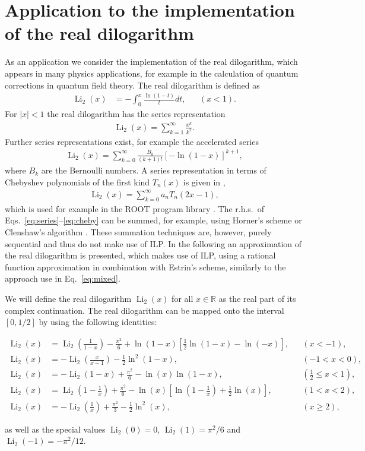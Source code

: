 \documentclass[10pt,DIV16,twocolumn]{scrartcl}
\newcommand{\Li}{\operatorname{Li}_2}
\begin{document}
\section{Application to the implementation of the real dilogarithm}

As an application we consider the implementation of the real
dilogarithm, which appears in many physics applications, for example
in the calculation of quantum corrections in quantum field theory.
The real dilogarithm is defined as
%
\begin{align}
  \Li(x) &= -\int_0^x \frac{\ln(1-t)}{t}dt, &
  &(x<1).
\end{align}
%
For $|x|<1$ the real dilogarithm has the series representation
%
\begin{align}
  \Li(x) = \sum_{k=1}^\infty \frac{x^k}{k^2}.
  \label{eq:series}
\end{align}
%
Further series representations exist, for example the accelerated
series
%
\begin{align}
  \Li(x) = \sum_{k=0}^\infty \frac{B_k}{(k+1)!} [-\ln(1-x)]^{k+1},
\end{align}
%
where $B_k$ are the Bernoulli numbers.  A series representation in
terms of Chebyshev polynomials of the first kind $T_n(x)$ is given in
\cite{luke},
%
\begin{align}
  \Li(x) = \sum_{k=0}^\infty a_n T_n(2x-1),
  \label{eq:cheby}
\end{align}
%
which is used for example in the ROOT program library \cite{root}.
The r.h.s.\ of Eqs.~\eqref{eq:series}--\eqref{eq:cheby} can be summed,
for example, using Horner's scheme or Clenshaw's algorithm
\cite{clenshaw}.  These summation techniques are, however, purely
sequential and thus do not make use of ILP.  In the following an
approximation of the real dilogarithm is presented, which makes use of
ILP, using a rational function approximation in combination with
Estrin's scheme, similarly to the approach use in
Eq.~\eqref{eq:mixed}.

We will define the real dilogarithm $\Li(x)$ for all $x\in\mathbb{R}$
as the real part of its complex continuation.  The real dilogarithm
can be mapped onto the interval $[0,1/2]$ by using the following
identities:
%
\begin{widetext}%
\begin{align}%
  \Li(x) &= \Li\left(\frac{1}{1-x}\right) - \frac{\pi^2}{6} + \ln(1-x)\left[\frac{1}{2}\ln(1-x) - \ln(-x)\right], && (x<-1), \\
  \Li(x) &= -\Li\left(\frac{x}{x-1}\right) - \frac{1}{2}\ln^2(1-x), && (-1<x<0), \\
  \Li(x) &= -\Li(1-x) + \frac{\pi^2}{6} - \ln(x) \ln(1-x), && (\frac{1}{2}\leq x<1), \\
  \Li(x) &= \Li\left(1-\frac{1}{x}\right) + \frac{\pi^2}{6} - \ln(x)\left[\ln\left(1-\frac{1}{x}\right) + \frac{1}{2}\ln(x)\right], && (1<x<2), \\
  \Li(x) &= -\Li\left(\frac{1}{x}\right) + \frac{\pi^2}{3} - \frac{1}{2} \ln^2(x), && (x\geq 2),%
\end{align}%
\end{widetext}%
%
as well as the special values $\Li(0)=0$, $\Li(1)=\pi^2/6$ and
$\Li(-1)=-\pi^2/12$.
\end{document}
